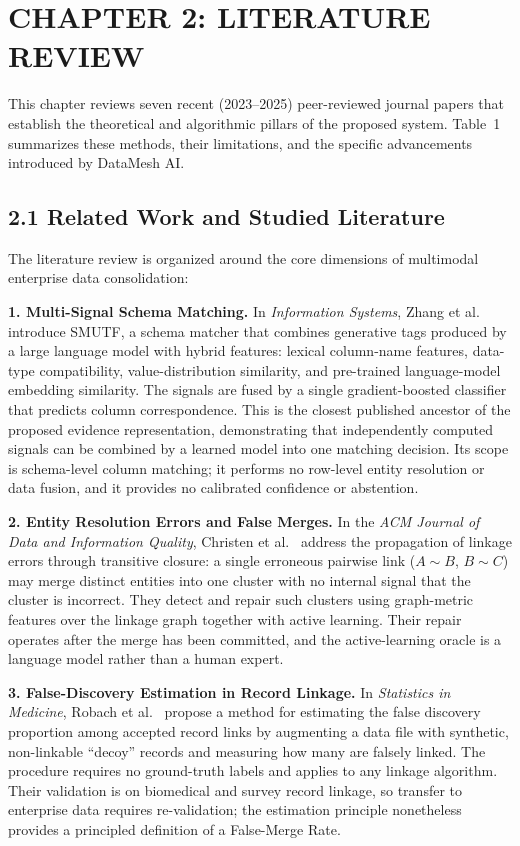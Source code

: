 \documentclass[12pt,a4paper]{article}
\newcommand{\chapter}[1]{%
  \clearpage
  \section*{#1}}
\begin{document}
\chapter{CHAPTER 2: LITERATURE REVIEW}\label{page:ch2}

This chapter reviews seven recent (2023--2025) peer-reviewed journal papers that establish the theoretical and algorithmic pillars of the proposed system. Table~1 summarizes these methods, their limitations, and the specific advancements introduced by DataMesh AI.

\subsection*{2.1 Related Work and Studied Literature}

The literature review is organized around the core dimensions of multimodal enterprise data consolidation:

\textbf{1. Multi-Signal Schema Matching.}
In \textit{Information Systems}, Zhang et al.\ \cite{smutf2025} introduce SMUTF, a schema matcher that combines generative tags produced by a large language model with hybrid features: lexical column-name features, data-type compatibility, value-distribution similarity, and pre-trained language-model embedding similarity. The signals are fused by a single gradient-boosted classifier that predicts column correspondence. This is the closest published ancestor of the proposed evidence representation, demonstrating that independently computed signals can be combined by a learned model into one matching decision. Its scope is schema-level column matching; it performs no row-level entity resolution or data fusion, and it provides no calibrated confidence or abstention.

\textbf{2. Entity Resolution Errors and False Merges.}
In the \textit{ACM Journal of Data and Information Quality}, Christen et al.\ \cite{christen2025cluster} address the propagation of linkage errors through transitive closure: a single erroneous pairwise link ($A\!\sim\!B$, $B\!\sim\!C$) may merge distinct entities into one cluster with no internal signal that the cluster is incorrect. They detect and repair such clusters using graph-metric features over the linkage graph together with active learning. Their repair operates after the merge has been committed, and the active-learning oracle is a language model rather than a human expert.

\textbf{3. False-Discovery Estimation in Record Linkage.}
In \textit{Statistics in Medicine}, Robach et al.\ \cite{robach2025falsediscovery} propose a method for estimating the false discovery proportion among accepted record links by augmenting a data file with synthetic, non-linkable ``decoy'' records and measuring how many are falsely linked. The procedure requires no ground-truth labels and applies to any linkage algorithm. Their validation is on biomedical and survey record linkage, so transfer to enterprise data requires re-validation; the estimation principle nonetheless provides a principled definition of a False-Merge Rate.
\end{document}
